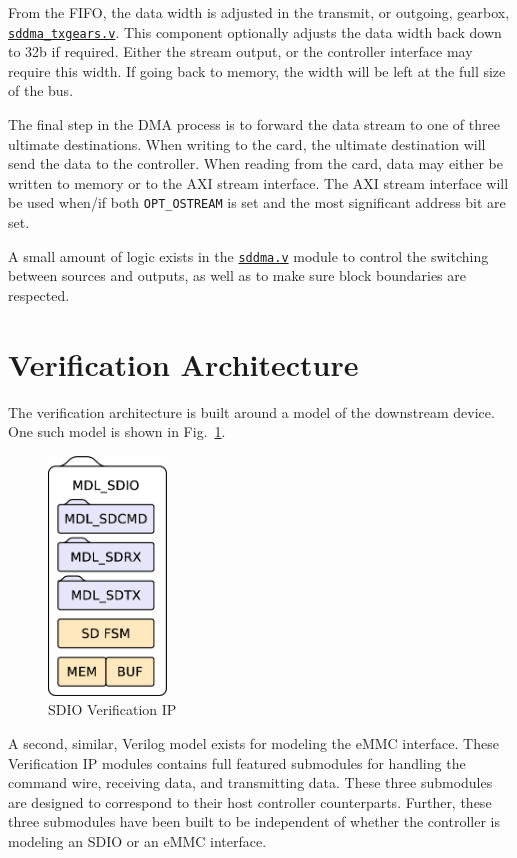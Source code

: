 \documentclass{gqtekspec}
\newcommand{\zhref}[2]{\href{#1}{\textcolor{dkblue}{#2}}}
\begin{document}
From the FIFO, the data width is adjusted in the transmit, or outgoing,
gearbox, \zhref{../rtl/sddma\_txgears.v}{\tt sddma\_txgears.v}.  This component
optionally adjusts the data width back down to 32b if required.  Either the
stream output, or the controller interface may require this width.  If going
back to memory, the width will be left at the full size of the bus.

The final step in the DMA process is to forward the data stream to one of
three ultimate destinations.  When writing to the card, the ultimate
destination will send the data to the controller.  When reading from the card,
data may either be written to memory or to the AXI stream interface.  The AXI
stream interface will be used when/if both {\tt OPT\_OSTREAM} is set and
the most significant address bit are set.

A small amount of logic exists in the \zhref{../rtl/sddma.v}{\tt sddma.v}
module to control the switching between sources and outputs, as well as to
make sure block boundaries are respected.
\section{Verification Architecture}\label{sec:arch-vip}
The verification architecture is built around a model of the
downstream device.  One such model is shown in Fig.~\ref{fig:mdlsdio}.
\begin{figure}\begin{center}
\includegraphics[height=2.5in]{gfx/mdlsdio.eps}
\caption{SDIO Verification IP}\label{fig:mdlsdio}
\end{center}\end{figure}
A second, similar, Verilog model exists for modeling the eMMC interface.
These Verification IP modules contains full featured submodules for handling
the command wire, receiving data, and transmitting data.  These three
submodules are designed to correspond to their host controller counterparts.
Further, these three submodules have been built to be independent of whether
the controller is modeling an SDIO or an eMMC interface.
\end{document}
